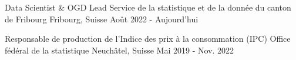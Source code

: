 
\begin{cventries}
  \cventry
    {Data Scientist \& OGD Lead}
    {Service de la statistique et de la donnée du canton de Fribourg}
    {Fribourg, Suisse}
    {Août 2022 - Aujourd'hui}
    {
      \begin{cvitems}
        \item {\ExpCurrentPipelineFr}
        \item {\ExpCurrentPortalFr}
        \item {\ExpCurrentGovernanceFr}
        \item {\ExpCurrentLeadershipFr}
      \end{cvitems}
    }

  \cventry
    {Responsable de production de l'Indice des prix à la consommation (IPC)}
    {Office fédéral de la statistique}
    {Neuchâtel, Suisse}
    {Mai 2019 - Nov. 2022}
    {
      \begin{cvitems}
        \item {\ExpCpiProcessingFr}
        \item {\ExpCpiQualityFr}
        \item {\ExpCpiModelingFr}
        \item {\ExpCpiLeadershipFr}
      \end{cvitems}
    }
\end{cventries}
